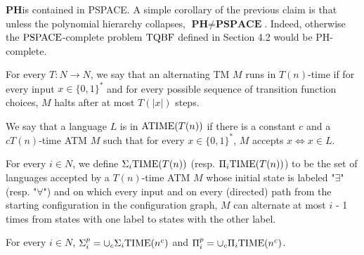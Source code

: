 \begin{note}
$\textbf{PH} $is contained in PSPACE. A simple corollary of the previous claim is that unless the polynomial hierarchy collapses, $\textbf{PH} \neq \textbf{PSPACE}$. Indeed, otherwise the $\mathrm{PSPACE}$-complete problem $\mathrm{TQBF}$ defined in Section 4.2 would be PH-complete.
\end{note}

\begin{note}
For every $T : N \to N$, we say that an alternating TM $M$ runs in $T(n)$-time if for every input $x \in \{0, 1\}^{\ast}$ and for every possible sequence of transition function choices, $M$ halts after at most $T(|x|)$ steps.

We say that a language $L$ is in $\mathrm{ATIME}(T(n))$ if there is a constant $c$ and a $cT(n)$-time ATM $M$ such that for every $x \in \{0, 1\}^{\ast}$, $M$ accepts $x \iff x \in L$.
\end{note}

\begin{note}
For every $i \in N$, we define $\Sigma_{i} \mathrm{TIME}(T(n))$ (resp. $\Pi_{i}\mathrm{TIME}(T(n))$) to be the set of languages accepted by a $T(n)$-time ATM $M$ whose initial state is labeled "$\exists$" (resp. "$\forall$") and on which every input and on every (directed) path from the starting configuration in the configuration graph, $M$ can alternate at most $i$ - 1 times from states with one label to states with the other label.
\end{note}

\begin{note}
For every $i \in N$, $\Sigma_{i}^{p} = \cup_{c}\Sigma_{i}\mathrm{TIME}(n^c)$ and $\Pi_{i}^{p} = \cup_{c} \Pi_{i} \mathrm{TIME}(n^c)$.
\end{note}









